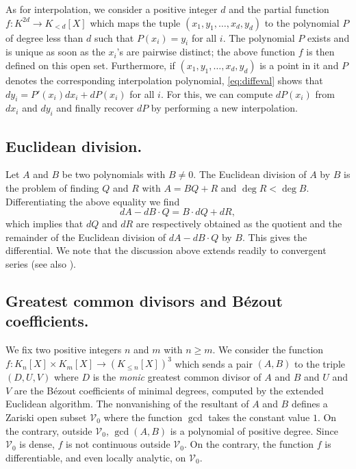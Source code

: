 \documentclass{sig-alternate}
\begin{document}
{As for interpolation, we consider a positive integer $d$ and the partial 
function $f : K^{2d} \to K_{< d}[X]$ which maps the tuple $(x_1, y_1, 
\ldots, x_d, y_d)$ to the polynomial $P$ of degree less than $d$ such 
that $P(x_i) = y_i$ for all $i$. The polynomial $P$ exists and is unique 
as soon as the $x_i$'s are pairwise distinct; the above function $f$ is 
then defined on this open set. Furthermore, if $(x_1, y_1, \ldots, x_d, 
y_d)$ is a point in it and $P$ denotes the corresponding interpolation 
polynomial, \eqref{eq:diffeval} shows that $d y_i = P'(x_i) dx_i + 
dP(x_i)$ for all $i$. For this, we can compute $dP(x_i)$ from $d x_i$ 
and $d y_i$ and finally recover $dP$ by performing a new interpolation.

\subsection*{Euclidean division.}

Let $A$ and $B$ be two polynomials with $B \neq 0$. The Euclidean division of 
$A$ by $B$ is the problem of finding $Q$ and $R$ with $A = BQ + R$ and $\deg R < \deg B$. 
Differentiating the above equality we find
\[
dA - dB \cdot Q = B \cdot dQ + dR,
\]
which implies that $dQ$ and $dR$ are respectively obtained as the 
quotient and the remainder of the Euclidean division of $dA - dB \cdot 
Q$ by $B$. This gives the differential. We note that the discussion 
above extends readily to convergent series (see also 
\cite{caruso-lubicz:14a}).

\subsection*{Greatest common divisors and B\'ezout coefficients.}

We fix two positive integers $n$ and $m$ with $n \geq m$. We consider the 
function $f : K_n[X] \times K_m[X] \to (K_{\leq n}[X])^3$ which sends a 
pair $(A,B)$ to the triple $(D, U, V)$ where $D$ is the \emph{monic} 
greatest common divisor of $A$ and $B$ and $U$ and $V$ are the B\'ezout 
coefficients of minimal degrees, computed by the extended 
Euclidean algorithm.
The nonvanishing of the resultant of $A$ and $B$ defines a Zariski open 
subset $\mathcal V_0$ where the function $\gcd$ takes the constant value 
$1$. On the contrary, outside $\mathcal V_0$, $\gcd(A,B)$ is a polynomial 
of positive degree.  Since $\mathcal V_0$ is dense, $f$ is not continuous outside 
$\mathcal V_0$. On the contrary, the function $f$ is differentiable, and even locally analytic,
on $\mathcal V_0$.

}
\end{document}
